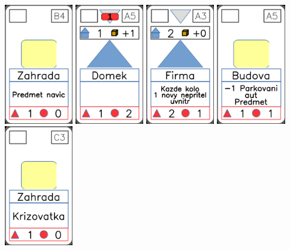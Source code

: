 \documentclass[a4paper]{article}
\begin{document}
	\includegraphics[width=3.0cm]{img-2_23}
	\includegraphics[width=3.0cm]{img-3_4}
	\includegraphics[width=3.0cm]{img-3_17}
	\includegraphics[width=3.0cm]{img-2_4}
	\includegraphics[width=3.0cm]{img-2_27}
\end{document}

